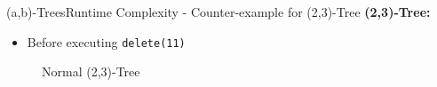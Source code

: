 


\begin{frame}{(a,b)-Trees}{Runtime Complexity - Counter-example for (2,3)-Tree}
  \textbf{(2,3)-Tree:}
  \begin{itemize}
    \item<2->
      Before executing \texttt{\color{Mittel-Blau}delete(11)}
  \end{itemize}
  \begin{figure}
    \begin{adjustbox}{width=0.6\linewidth}
      
    \end{adjustbox}
    \label{fig:a_b_tree:2_3_tree_1}
    \caption{Normal (2,3)-Tree}
  \end{figure}
\end{frame}


